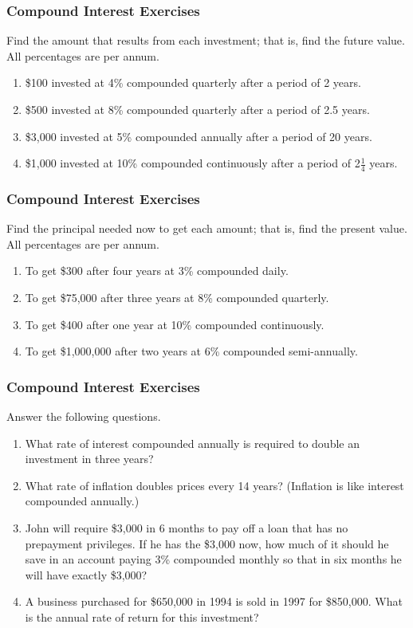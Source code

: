 \documentclass[xcolor=dvipsnames]{beamer}
\begin{document}
\begin{frame}
  \frametitle{Compound Interest Exercises}
{\ubung} Find the amount that results from each investment; that is, find the
\alert{future value}. All percentages are per annum.
\begin{enumerate}
\item \$100 invested at 4\% compounded quarterly after a period of 2
  years.
\item \$500 invested at 8\% compounded quarterly after a period of 2.5
  years.
\item \$3,000 invested at 5\% compounded annually after a period of 20
  years.
\item \$1,000 invested at 10\% compounded continuously after a period of 2$\frac{1}{4}$
  years.
\end{enumerate}
\end{frame}

\begin{frame}
  \frametitle{Compound Interest Exercises}
{\ubung} Find the principal needed now to get each amount; that is, find the
\alert{present value}. All percentages are per annum.
\begin{enumerate}
\item To get \$300 after four years at 3\% compounded daily.
\item To get \$75,000 after three years at 8\% compounded quarterly.
\item To get \$400 after one year at 10\% compounded continuously.
\item To get \$1,000,000 after two years at 6\% compounded semi-annually.
\end{enumerate}
\end{frame}

\begin{frame}
  \frametitle{Compound Interest Exercises}
{\ubung} Answer the following questions.
  \begin{enumerate}
  \item What rate of interest compounded annually is required to double an investment in three years?
  \item What rate of inflation doubles prices every 14 years?
    (Inflation is like interest compounded annually.)
  \item John will require \$3,000 in 6 months to pay off a loan
    that has no prepayment privileges. If he has the \$3,000 now, how
    much of it should he save in an account paying 3\% compounded
    monthly so that in six months he will have exactly \$3,000?
  \item A business purchased for \$650,000 in 1994 is sold in 1997
    for \$850,000. What is the annual rate of return for this investment?
  \end{enumerate}
\end{frame}
\end{document}
